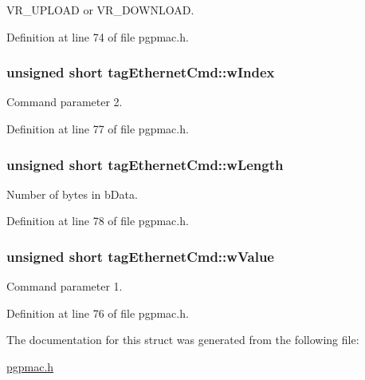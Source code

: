 V\-R\-\_\-\-U\-P\-L\-O\-A\-D or V\-R\-\_\-\-D\-O\-W\-N\-L\-O\-A\-D. 



Definition at line 74 of file pgpmac.\-h.

\hypertarget{structtagEthernetCmd_a92f5a374e87d4f496b64b4888850d6e6}{
\subsubsection[{w\-Index}]{\setlength{\rightskip}{0pt plus 5cm}unsigned short tag\-Ethernet\-Cmd\-::w\-Index}}\label{structtagEthernetCmd_a92f5a374e87d4f496b64b4888850d6e6}


Command parameter 2. 



Definition at line 77 of file pgpmac.\-h.

\hypertarget{structtagEthernetCmd_af5df25ff13ca30fa33719d0df1ab7e97}{
\subsubsection[{w\-Length}]{\setlength{\rightskip}{0pt plus 5cm}unsigned short tag\-Ethernet\-Cmd\-::w\-Length}}\label{structtagEthernetCmd_af5df25ff13ca30fa33719d0df1ab7e97}


Number of bytes in b\-Data. 



Definition at line 78 of file pgpmac.\-h.

\hypertarget{structtagEthernetCmd_aec0ee9a5f6c7e3bc6e4bd98f1bd52783}{
\subsubsection[{w\-Value}]{\setlength{\rightskip}{0pt plus 5cm}unsigned short tag\-Ethernet\-Cmd\-::w\-Value}}\label{structtagEthernetCmd_aec0ee9a5f6c7e3bc6e4bd98f1bd52783}


Command parameter 1. 



Definition at line 76 of file pgpmac.\-h.



The documentation for this struct was generated from the following file\-:\begin{DoxyCompactItemize}
\item 
\hyperlink{pgpmac_8h}{pgpmac.\-h}\end{DoxyCompactItemize}
